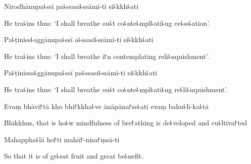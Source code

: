 Nirodhānupa꜕ssī pa꜕ssasi꜕ssāmī-ti si꜕kkh꜕ati

\begin{english}
  He tra꜕ins thus: `I shall breathe ou꜕t co꜕nte꜕mpl꜕ati꜕ng ce꜕ss꜕ation'.
\end{english}

Pa꜕ṭiniss꜕aggānupa꜕ssī a꜕ssasi꜕ssāmī-ti si꜕kkh꜕ati

\begin{english}
  He tra꜕ins thus: `I shall breathe i꜓n contemplating reli꜕nquishment'.
\end{english}

Pa꜕ṭinissa꜕ggānupa꜕ssī pa꜕ssasi꜕ssāmī-ti si꜕kkh꜕ati

\begin{english}
  He tra꜕ins thus: `I shall breathe ou꜕t co꜕nte꜕mpl꜕ati꜕ng re꜕li꜕nquishment'.
\end{english}

Evaṃ bhāvi꜓tā kho bhi꜓kkha꜕ve ānāpāna꜓ss꜕ati evaṃ bahu꜕lī-ka꜕tā

\begin{english}
  Bhikkhus, that is ho꜕w mindfulness of bre꜓athing is de꜕veloped and cu꜕ltiva꜓ted
\end{english}

Mahappha꜕lā ho꜓ti mahā꜓-nisa꜓ṃsā-ti

\begin{english}
  So that it is of gr꜕eat fruit and great be꜕nefit.
\end{english}


